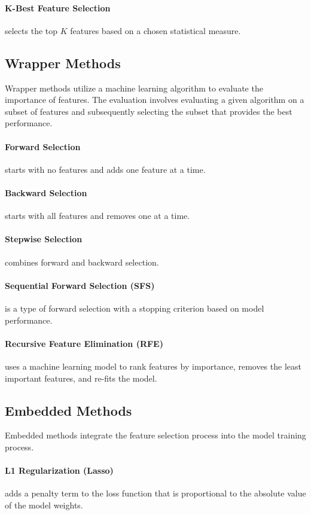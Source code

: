 \paragraph{K-Best Feature Selection} selects the top $K$ features based on a chosen statistical measure.

\subsection{Wrapper Methods}

Wrapper methods utilize a machine learning algorithm to evaluate the importance of features. The evaluation involves evaluating a given algorithm on a subset of features and subsequently selecting the subset that provides the best performance.

\paragraph{Forward Selection} starts with no features and adds one feature at a time.
\paragraph{Backward Selection} starts with all features and removes one at a time.
\paragraph{Stepwise Selection} combines forward and backward selection.
\paragraph{Sequential Forward Selection (SFS)} is a type of forward selection with a stopping criterion based on model performance.
\paragraph{Recursive Feature Elimination (RFE)} uses a machine learning model to rank features by importance, removes the least important features, and re-fits the model.

\subsection{Embedded Methods}

Embedded methods integrate the feature selection process into the model training process.

\paragraph{L1 Regularization (Lasso)} adds a penalty term to the loss function that is proportional to the absolute value of the model weights.
